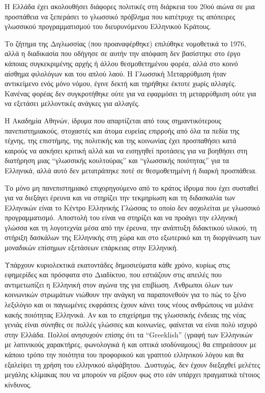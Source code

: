 \begin{multicols}{2}
Η Ελλάδα έχει ακολουθήσει διάφορες πολιτικές  στη διάρκεια του 20ού αιώνα σε μια προσπάθεια να ξεπεράσει το γλωσσικό πρόβλημα που κατέτρυχε τις απόπειρες γλωσσικού προγραμματισμού του διευρυνόμενου Ελληνικού Κράτους. 

Το ζήτημα της Διγλωσσίας (που προαναφέρθηκε) επιλύθηκε νομοθετικά το 1976, αλλά η διαδικασία που οδήγησε σε αυτήν την απόφαση δεν βασίστηκε στο έργο κάποιας συγκεκριμένης αρχής ή άλλου θεσμοθετημένου φορέα, αλλά στο κοινό αίσθημα φιλολόγων και του απλού λαού. Η Γλωσσική Μεταρρύθμιση ήταν αντικείμενο ενός μόνο νόμου,  έγινε δεκτή και τηρήθηκε έκτοτε χωρίς αλλαγές. Κανένας φορέας δεν συγκροτήθηκε ούτε για να εφαρμόσει τη μεταρρύθμιση ούτε για να εξετάσει μελλοντικές ανάγκες για αλλαγές.

Η Ακαδημία Αθηνών, ίδρυμα που απαρτίζεται από τους σημαντικότερους πανεπιστημιακούς, στοχαστές και άτομα ευρείας επιρροής από όλα τα πεδία της τέχνης, της επιστήμης, της πολιτικής και της κοινωνίας έχει προσπαθήσει κατά καιρούς  να ασκήσει κριτική αλλά και να εισηγηθεί προτάσεις για να βοηθήσει στη διατήρηση μιας “γλωσσικής κουλτούρας” και “γλωσσικής ποιότητας” για τα Ελληνικά, αλλά αυτό δεν μετατράπηκε ποτέ σε θεσμοθετημένη ή διαρκή προσπάθεια.

Το μόνο μη πανεπιστημιακό επιχορηγούμενο από το κράτος ίδρυμα που έχει συσταθεί για να διεξάγει έρευνα και να στηρίζει την τεκμηρίωση και τη διδασκαλία των Ελληνικών είναι το Κέντρο Ελληνικής Γλώσσας το οποίο δεν ασχολείται με   γλωσσικό προγραμματισμό. Αποστολή του είναι να στηρίζει και να προάγει την ελληνική γλώσσα και τη λογοτεχνία μέσα από την έρευνα, την ανάπτυξη διδακτικού υλικού, τη στήριξη δασκάλων της Ελληνικής στη χώρα και στο εξωτερικό και τη διοργάνωση των μοναδικών επίσημων εξετάσεων επάρκειας στην Ελληνική.

Υπάρχουν κυριολεκτικά εκατοντάδες δημοσιεύματα κάθε χρόνο, κυρίως στις εφημερίδες και πρόσφατα στο Διαδίκτυο, που εστιάζουν στις απειλές που αντιμετωπίζει η Ελληνική στον αγώνα της για επιβίωση. Άνθρωποι όλων των κοινωνικών στρωμάτων νιώθουν την ανάγκη να παραπονεθούν για το πώς το ξένο λεξιλόγιο και οι παγιωμένες εκφράσεις  έχουν κάνει τους νέους ανθρώπους να μιλάνε κακής ποιότητας Ελληνικά. Αν και το επιχείρημα της γλωσσικής ένδειας της νέας γενιάς είναι σύνηθες σε πολλές γλώσσες και κοινωνίες, φαίνεται να είναι πολύ ισχυρό στην Ελλάδα. Πολλοί ανησυχούν επίσης ότι τα “Greeklish” (γραφή των Ελληνικών με λατινικούς χαρακτήρες, φωνολογικά ή και οπτικά ισοδύναμους) θα επηρεάσουν με κάποιο τρόπο την ποιότητα του προφορικού και γραπτού ελληνικού λόγου και θα εξαλείψει τη χρήση του  ελληνικού αλφάβητου. Δυστυχώς, δεν έχουν διεξαχθεί μελέτες μεγάλης κλίμακας που να μπορούν να ρίξουν φως στο εάν υπάρχει πραγματικά τέτοιος κίνδυνος.


\end{multicols}
